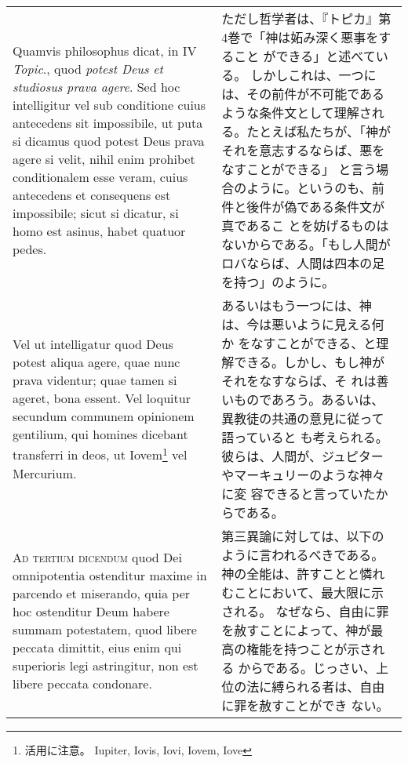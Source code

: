 \documentclass[10pt]{jsarticle} %
\begin{document}
\begin{longtable}{p{21em}p{21em}}
\\

Quamvis philosophus dicat, in IV {\itshape Topic}.,
quod {\itshape potest Deus et studiosus prava agere}. 
Sed hoc intelligitur vel sub
conditione cuius antecedens sit impossibile, ut puta si dicamus quod
potest Deus prava agere si velit, nihil enim prohibet conditionalem esse
veram, cuius antecedens et consequens est impossibile; sicut si dicatur,
si homo est asinus, habet quatuor pedes. 

&

ただし哲学者は、『トピカ』第4巻で「神は妬み深く悪事をすること
 ができる」と述べている。
しかしこれは、一つには、その前件が不可能であるような条件文として理解され
 る。たとえば私たちが、「神がそれを意志するならば、悪をなすことができる」
 と言う場合のように。というのも、前件と後件が偽である条件文が真であるこ
 とを妨げるものはないからである。「もし人間がロバならば、人間は四本の足
 を持つ」のように。



\\



Vel ut intelligatur quod Deus
potest aliqua agere, quae nunc prava videntur; quae tamen si ageret,
bona essent. Vel loquitur secundum communem opinionem gentilium, qui
homines dicebant transferri in deos, ut Iovem\footnote{活用に注意。
 Iupiter, Iovis, Iovi, Iovem, Iove} vel Mercurium.

&

あるいはもう一つには、神は、今は悪いように見える何か
 をなすことができる、と理解できる。しかし、もし神がそれをなすならば、そ
 れは善いものであろう。あるいは、異教徒の共通の意見に従って語っていると
 も考えられる。彼らは、人間が、ジュピターやマーキュリーのような神々に変
 容できると言っていたからである。


\\

{\scshape Ad tertium dicendum} quod Dei omnipotentia
ostenditur maxime in parcendo et miserando, quia per hoc ostenditur Deum
habere summam potestatem, quod libere peccata dimittit, eius enim qui
superioris legi astringitur, non est libere peccata condonare. 

&

第三異論に対しては、以下のように言われるべきである。
神の全能は、許すことと憐れむことにおいて、最大限に示される。
なぜなら、自由に罪を赦すことによって、神が最高の権能を持つことが示される
 からである。じっさい、上位の法に縛られる者は、自由に罪を赦すことができ
 ない。


\end{longtable}
\end{document}
